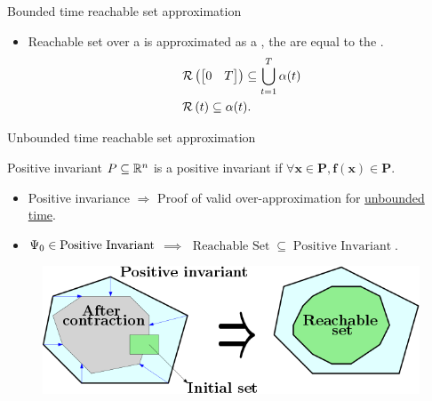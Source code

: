 \begin{frame}{Bounded time reachable set approximation}
\begin{itemize}
\item Reachable set over a  is
approximated as a , the  are equal to the .
%
{
\begin{align*}
& \mathcal{R}\left(\left[\begin{matrix}0 & T\end{matrix}\right]\right)\subseteq\bigcup_{t=1}^T\alpha(t)\\
& \mathcal{R}\left(t\right)\subseteq\alpha(t).
\end{align*}
}
%
\end{itemize}
%
\end{frame}

\begin{frame}{Unbounded time reachable set approximation}
%
\begin{block}{Positive invariant}
$P\subseteq\mathbb{R}^n$ is a positive invariant if
%
$
\bm{\forall x\in P, f(x)\in P}.
$
%
\end{block}
%
\begin{itemize}
\item
{\color{blue} Positive invariance $\Rightarrow$} Proof of
{\color{blue} valid over-approximation} for \underline{unbounded
time}.
\item {$\Psi_0\in \operatorname{Positive~Invariant}$}
$\implies$ {$\operatorname{Reachable~Set}\subseteq \operatorname{Positive~Invariant}$}.
\end{itemize}
%
\begin{figure}
\includegraphics[scale=0.35]{figures/positive-invariant.png}
\end{figure}
%
\end{frame}

